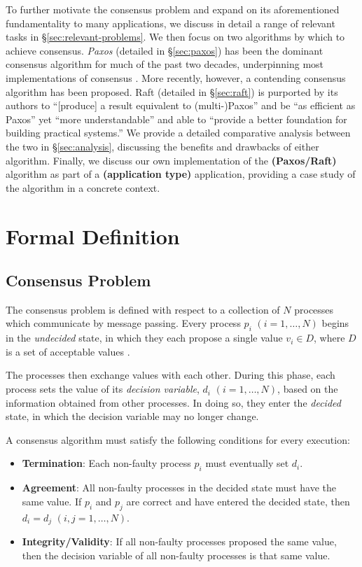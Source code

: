 \documentclass[12pt, a4paper]{article}
\begin{document}
To further motivate the consensus problem and expand on its aforementioned
fundamentality to many applications, we discuss in detail a range of relevant
tasks in \S\ref{sec:relevant-problems}. We then focus on two algorithms by which
to achieve consensus. \textit{Paxos} \cite{lamport1998part, lamport2001paxos}
(detailed in \S\ref{sec:paxos}) has been the dominant consensus algorithm for
much of the past two decades, underpinning most implementations of consensus
\cite{ongaro2014search}. More recently, however, a contending consensus
algorithm has been proposed. Raft \cite{ongaro2014search} (detailed in
\S\ref{sec:raft}) is purported by its authors to ``[produce] a result equivalent
to (multi-)Paxos'' and be ``as efficient as Paxos'' yet ``more understandable''
and able to ``provide a better foundation for building practical systems.''
\cite{ongaro2014search} We provide a detailed comparative analysis between the
two in \S\ref{sec:analysis}, discussing the benefits and drawbacks of either
algorithm. Finally, we discuss our own implementation of the
\textbf{(Paxos/Raft)} algorithm as part of a \textbf{(application type)}
application, providing a case study of the algorithm in a concrete context.


\section{Formal Definition}

\subsection{Consensus Problem} \label{sec:consensus-def}

The consensus problem is defined with respect to a collection of $N$ processes
which communicate by message passing. Every process $p_{i}$ $(i = 1, \ldots, N)$
begins in the \textit{undecided} state, in which they each propose a single
value $v_{i} \in D$, where $D$ is a set of acceptable values
\cite{coulouris2005distributed}.

The processes then exchange values with each other. During this phase, each
process sets the value of its \textit{decision variable}, $d_i$ $(i = 1, \ldots,
N)$, based on the information obtained from other processes. In doing so, they
enter the \textit{decided} state, in which the decision variable may no longer
change.

A consensus algorithm must satisfy the following conditions for every execution:

\begin{itemize}
  \item \textbf{Termination}: Each non-faulty process $p_i$ must eventually set
    $d_i$.
  \item \textbf{Agreement}: All non-faulty processes in the decided state
    must have the same value. If $p_{i}$ and $p_{j}$ are correct and have
    entered the decided state, then $d_{i} = d_{j}$ $(i, j = 1, \ldots, N)$.
  \item \textbf{Integrity/Validity}: If all non-faulty processes proposed
    the same value, then the decision variable of all non-faulty processes is
    that same value.
\end{itemize}
\end{document}
